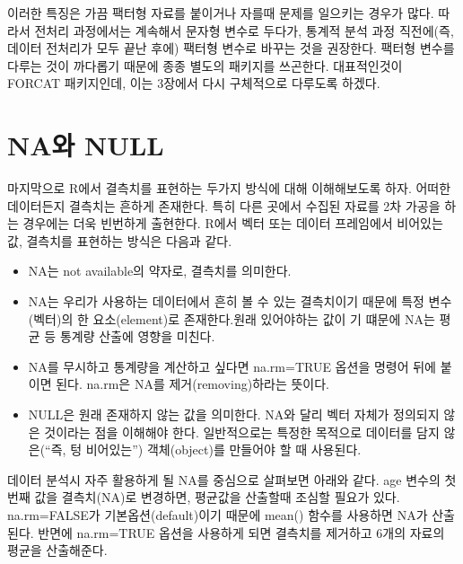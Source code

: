 \documentclass[
]{book}
\newenvironment{Shaded}{\begin{snugshade}}{\end{snugshade}}
\newcommand{\DocumentationTok}[1]{\textcolor[rgb]{0.56,0.35,0.01}{\textbf{\textit{#1}}}}
\newcommand{\FunctionTok}[1]{\textcolor[rgb]{0.13,0.29,0.53}{\textbf{#1}}}
\newcommand{\NormalTok}[1]{#1}
\newcommand{\OtherTok}[1]{\textcolor[rgb]{0.56,0.35,0.01}{#1}}
\newcommand{\SpecialCharTok}[1]{\textcolor[rgb]{0.81,0.36,0.00}{\textbf{#1}}}
\providecommand{\tightlist}{%
  \setlength{\itemsep}{0pt}\setlength{\parskip}{0pt}}
\begin{document}
\begin{Shaded}
\end{Shaded}

이러한 특징은 가끔 팩터형 자료를 붙이거나 자를때 문제를 일으키는 경우가 많다. 따라서 전처리 과정에서는 계속해서 문자형 변수로 두다가, 통계적 분석 과정 직전에(즉, 데이터 전처리가 모두 끝난 후에) 팩터형 변수로 바꾸는 것을 권장한다.
팩터형 변수를 다루는 것이 까다롭기 때문에 종종 별도의 패키지를 쓰곤한다. 대표적인것이 FORCAT 패키지인데, 이는 3장에서 다시 구체적으로 다루도록 하겠다.

\section{NA와 NULL}\label{nauxc640-null}

마지막으로 R에서 결측치를 표현하는 두가지 방식에 대해 이해해보도록 하자. 어떠한 데이터든지 결측치는 흔하게 존재한다. 특히 다른 곳에서 수집된 자료를 2차 가공을 하는 경우에는 더욱 빈번하게 출현한다. R에서 벡터 또는 데이터 프레임에서 비어있는 값, 결측치를 표현하는 방식은 다음과 같다.

\begin{itemize}
\tightlist
\item
  NA는 not available의 약자로, 결측치를 의미한다.\\
\item
  NA는 우리가 사용하는 데이터에서 흔히 볼 수 있는 결측치이기 때문에 특정 변수(벡터)의 한 요소(element)로 존재한다.원래 있어야하는 값이 기 떄문에 NA는 평균 등 통계량 산출에 영향을 미친다.
\item
  NA를 무시하고 통계량을 계산하고 싶다면 na.rm=TRUE 옵션을 명령어 뒤에 붙이면 된다. na.rm은 NA를 제거(removing)하라는 뜻이다.
\item
  NULL은 원래 존재하지 않는 값을 의미한다. NA와 달리 벡터 자체가 정의되지 않은 것이라는 점을 이해해야 한다. 일반적으로는 특정한 목적으로 데이터를 담지 않은(``즉, 텅 비어있는'') 객체(object)를 만들어야 할 때 사용된다.
\end{itemize}

데이터 분석시 자주 활용하게 될 NA를 중심으로 살펴보면 아래와 같다. age 변수의 첫번째 값을 결측치(NA)로 변경하면, 평균값을 산출할때 조심할 필요가 있다. na.rm=FALSE가 기본옵션(default)이기 때문에 mean() 함수를 사용하면 NA가 산출된다. 반면에 na.rm=TRUE 옵션을 사용하게 되면 결측치를 제거하고 6개의 자료의 평균을 산출해준다.
\end{document}
